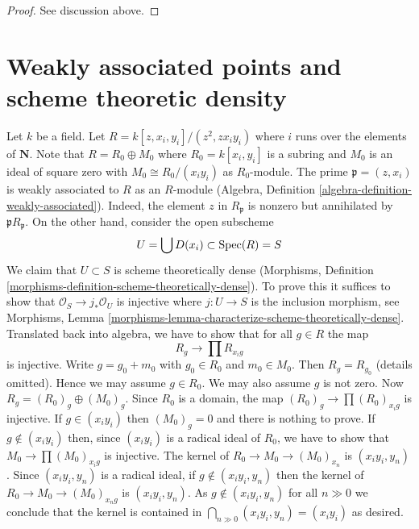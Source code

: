 \begin{proof}
See discussion above.
\end{proof}





\section{Weakly associated points and scheme theoretic density}
\label{section-weak-ass-dense}

\noindent
Let $k$ be a field. Let $R = k[z, x_i, y_i]/(z^2, zx_iy_i)$ where
$i$ runs over the elements of $\mathbf{N}$. Note that $R = R_0 \oplus M_0$ where
$R_0 = k[x_i, y_i]$ is a subring and $M_0$ is an ideal of square zero
with $M_0 \cong R_0/(x_iy_i)$ as $R_0$-module. The prime
$\mathfrak p = (z, x_i)$ is weakly associated to $R$ as an $R$-module
(Algebra, Definition \ref{algebra-definition-weakly-associated}).
Indeed, the element $z$ in $R_\mathfrak p$ is nonzero but annihilated
by $\mathfrak pR_\mathfrak p$. On the other hand, consider the open
subscheme
$$
U = \bigcup D(x_i) \subset \mathop{\mathrm{Spec}}(R) = S
$$
We claim that $U \subset S$ is scheme theoretically dense
(Morphisms, Definition \ref{morphisms-definition-scheme-theoretically-dense}).
To prove this it suffices to show that $\mathcal{O}_S \to j_*\mathcal{O}_U$
is injective where $j : U \to S$ is the inclusion morphism, see 
Morphisms, Lemma \ref{morphisms-lemma-characterize-scheme-theoretically-dense}.
Translated back into algebra, we have to show that for all $g \in R$
the map
$$
R_g \longrightarrow \prod R_{x_ig}
$$
is injective. Write $g = g_0 + m_0$ with $g_0 \in R_0$ and $m_0 \in M_0$.
Then $R_g = R_{g_0}$ (details omitted). Hence we may assume $g \in R_0$.
We may also assume $g$ is not zero. Now $R_g = (R_0)_g \oplus (M_0)_g$.
Since $R_0$ is a domain, the map $(R_0)_g \to \prod (R_0)_{x_ig}$ is
injective. If $g \in (x_iy_i)$ then $(M_0)_g = 0$ and there is nothing
to prove. If $g \not \in (x_iy_i)$ then, since
$(x_iy_i)$ is a radical ideal of $R_0$, we have to show that
$M_0 \to \prod (M_0)_{x_ig}$ is injective. The kernel of
$R_0 \to M_0 \to (M_0)_{x_n}$ is $(x_iy_i, y_n)$. Since
$(x_iy_i, y_n)$ is a radical ideal, if $g \not \in (x_iy_i, y_n)$
then the kernel of $R_0 \to M_0 \to (M_0)_{x_ng}$ is $(x_iy_i, y_n)$.
As $g \not \in (x_iy_i, y_n)$ for all $n \gg 0$ we conclude that
the kernel is contained in $\bigcap_{n \gg 0} (x_iy_i, y_n) = (x_iy_i)$
as desired.

